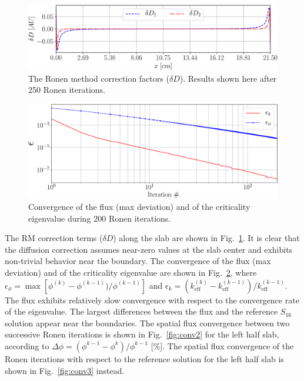 \begin{figure}[htbp]
	\centering
	\includegraphics[width=0.65\linewidth]{dD_Tomatis2011_400_250it.pdf}
	\caption{The Ronen method correction factors ($\delta D$). Results shown here after 250 Ronen iterations.}
	\label{fig:slab-RM-corr-factor}
\end{figure}



\begin{figure}[htbp]
	\centering
	\includegraphics[width=0.65\linewidth]{epsilon.pdf}	
	\caption{Convergence of the flux (max deviation) and of the criticality
		eigenvalue during 200 Ronen iterations.}
	\label{fig:conv}
\end{figure}

The RM correction terms ($\delta D$) along the slab are shown in Fig.~\ref{fig:slab-RM-corr-factor}. It is clear that the diffusion correction assumes near-zero values at the slab center and exhibits non-trivial behavior near the boundary. The convergence of the flux (max deviation) and of the criticality eigenvalue are shown in Fig.~\ref{fig:conv}, where $\epsilon_\phi = \operatorname{max} [\phi^{(k)}-\phi^{(k-1)})/\phi^{(k-1)}]$ and $\epsilon_k = (k_\textrm{eff}^{(k)}-k_\textrm{eff}^{(k-1)})/k_\textrm{eff}^{(k-1)}$. The flux exhibits relatively slow convergence with respect to the convergence rate of the eigenvalue. The largest differences between the flux and the reference $S_{16}$ solution appear near the boundaries. The spatial flux convergence between two successive Ronen iterations is shown in Fig.~\ref{fig:conv2} for the left half slab, according to $\Delta \phi = (\phi^{k-1}-\phi^k)/\phi^{k-1}$ [\%]. The spatial flux convergence of the Ronen iterations with respect to the reference solution for the left half slab is shown in Fig.~\ref{fig:conv3} instead.

